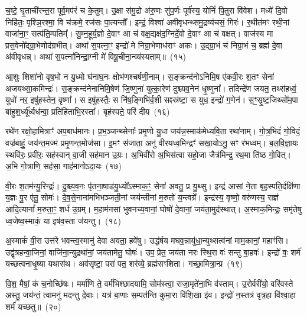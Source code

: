 च॒ष्टे॒ घृ॒ताची॑रन्त॒रा पूर्व॒मप॑रं च के॒तुम्। उ॒क्षा स॑मु॒द्रो अ॑रु॒णः सु॑प॒र्णः पूर्व॑स्य॒ योनिं॑ पि॒तुरा वि॑वेश। मध्ये॑ दि॒वो निहि॑तः॒ पृश्ञि॒रश्मा॒ वि च॑क्रमे॒ रज॑सः पा॒त्यन्तौ᳚। इन्द्रं॒ विश्वा॑ अवीवृधन्थ्समु॒द्रव्य॑चसं॒ गिरः॑। र॒थीत॑मꣳ रथी॒नां वाजा॑ना॒ꣳ॒ सत्प॑ति॒म्पतिम्᳚। सु॒म्न॒हूर्य॒ज्ञो दे॒वाꣳ आ च॑ वक्ष॒द्यक्ष॑द॒ग्निर्दे॒वो दे॒वाꣳ आ च॑ वक्षत्। वाज॑स्य मा प्रस॒वेनो᳚द्ग्रा॒भेणोद॑ग्रभीत्। अथा॑ स॒पत्ना॒ꣳ॒ इन्द्रो॑ मे निग्रा॒भेणाध॑राꣳ अकः। उ॒द्ग्रा॒भं च॑ निग्रा॒भं च॒ ब्रह्म॑ दे॒वा अ॑वीवृधन्न्। अथा॑ स॒पत्ना॑निन्द्रा॒ग्नी मे॑ विषू॒चीना॒न्व्य॑स्यताम्॥~(१५)

{\anuvakamend[{दे॒वाः श॒तप॑या अ॒भि वाज॑स्य॒ षड्विꣳ॑शतिश्च}]}%

आ॒शुः शिशा॑नो वृष॒भो न यु॒ध्मो घ॑नाघ॒नः क्षोभ॑णश्चर्\mbox{}षणी॒नाम्। स॒ङ्क्रन्द॑नो\-ऽनिमि॒ष ए॑कवी॒रः श॒तꣳ सेना॑ अजयथ्सा॒कमिन्द्रः॑। स॒ङ्क्रन्द॑नेनानिमि॒षेण॑ जि॒ष्णुना॑ युत्का॒रेण॑ दुश्च्यव॒नेन॑ धृ॒ष्णुना᳚। तदिन्द्रे॑ण जयत॒ तथ्स॑हध्वं॒ युधो॑ नर॒ इषु॑हस्तेन॒ वृष्णा᳚। स इषु॑हस्तैः॒ स नि॑ष॒ङ्गिभि॑र्व॒शी सꣴस्र॑ष्टा॒ स युध॒ इन्द्रो॑ ग॒णेन॑। स॒ꣳ॒सृ॒ष्ट॒जिथ्सो॑म॒पा बा॑हुश॒र्ध्यू᳚र्ध्वध॑न्वा॒ प्रति॑हिताभि॒रस्ता᳚। बृह॑स्पते॒ परि॑ दीय~(१६)

रथे॑न रक्षो॒हामित्राꣳ॑ अप॒बाध॑मानः। प्र॒भ॒ञ्जन्थ्सेनाः᳚ प्रमृ॒णो यु॒धा जय॑न्न॒स्माक॑मेध्यवि॒ता रथा॑नाम्। गो॒त्र॒भिदं॑ गो॒विदं॒ वज्र॑बाहुं॒ जय॑न्त॒मज्म॑ प्रमृ॒णन्त॒मोज॑सा। इ॒मꣳ स॑जाता॒ अनु॑ वीरयध्व॒मिन्द्रꣳ॑ सखा॒यो\-ऽनु॒ सꣳ र॑भध्वम्। ब॒ल॒वि॒ज्ञा॒यः स्थवि॑रः॒ प्रवी॑रः॒ सह॑स्वान् वा॒जी सह॑मान उ॒ग्रः। अ॒भिवी॑रो अ॒भिस॑त्वा सहो॒जा जैत्र॑मिन्द्र॒ रथ॒मा ति॑ष्ठ गो॒वित्। अ॒भि गो॒त्राणि॒ सह॑सा॒ गाह॑मानो\-ऽदा॒यः~(१७)

वी॒रः श॒तम॑न्यु॒रिन्द्रः॑। दु॒श्च्य॒व॒नः पृ॑तना॒षाड॑यु॒ध्यो᳚\-ऽस्माक॒ꣳ॒ सेना॑ अवतु॒ प्र यु॒थ्सु। इन्द्र॑ आसां ने॒ता बृह॒स्पति॒र्दक्षि॑णा य॒ज्ञः पु॒र ए॑तु॒ सोमः॑। दे॒व॒से॒नाना॑मभिभञ्जती॒नां जय॑न्तीनां म॒रुतो॑ य॒न्त्वग्रे᳚। इन्द्र॑स्य॒ वृष्णो॒ वरु॑णस्य॒ राज्ञ॑ आदि॒त्यानां᳚ म॒रुता॒ꣳ॒ शर्ध॑ उ॒ग्रम्। म॒हाम॑नसां भुवनच्य॒वानां॒ घोषो॑ दे॒वानां॒ जय॑ता॒मुद॑स्थात्। अ॒स्माक॒मिन्द्रः॒ समृ॑तेषु ध्व॒जेष्व॒स्माकं॒ या इष॑व॒स्ता ज॑यन्तु।~(१८)

अ॒स्माकं॑ वी॒रा उत्त॑रे भवन्त्व॒स्मानु॑ देवा अवता॒ हवे॑षु। उद्ध॑र्\mbox{}षय मघव॒न्नायु॑धा॒न्युथ्सत्व॑नां माम॒कानां॒ महाꣳ॑सि। उद्वृ॑त्रहन्वा॒जिनां॒ वाजि॑ना॒न्युद्रथा॑नां॒ जय॑तामेतु॒ घोषः॑। उप॒ प्रेत॒ जय॑ता नरः स्थि॒रा वः॑ सन्तु बा॒हवः॑। इन्द्रो॑ वः॒ शर्म॑ यच्छत्वनाधृ॒ष्या यथास॑थ। अव॑सृष्टा॒ परा॑ पत॒ शर॑व्ये॒ ब्रह्म॑सꣳशिता। गच्छा॒मित्रा॒न्प्र~(१९)

वि॒श॒ मैषां॒ कं च॒नोच्छि॑षः। मर्मा॑णि ते॒ वर्म॑भिश्छादयामि॒ सोम॑स्त्वा॒ राजा॒मृते॑ना॒भि व॑स्ताम्। उ॒रोर्वरी॑यो॒ वरि॑वस्ते अस्तु॒ जय॑न्तं॒ त्वामनु॑ मदन्तु दे॒वाः। यत्र॑ बा॒णाः स॒म्पत॑न्ति कुमा॒रा वि॑शि॒खा इ॑व। इन्द्रो॑ न॒स्तत्र॑ वृत्र॒हा वि॑श्वा॒हा शर्म॑ यच्छतु॥~(२०)


